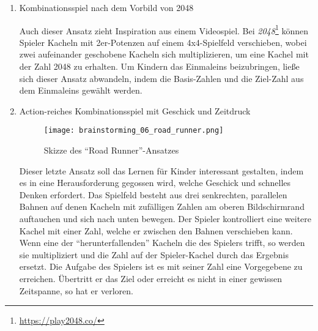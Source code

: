 \begin{enumerate}
  Dieser Ansatz ist inspiriert durch das Videospiel \emph{Dorfromantik}\footnote{\url{https://toukana.com/dorfromantik/}}, in dem verschiedene hexagonale Landschafts-Kacheln auf einem Spielbrett derart angebracht werden müssen, dass sie Synergie-Effekte erzielen.
  Wenn sich das Spielprinzip so anpassen ließe, dass eine Spielerin Kacheln mit verschiedenen Zahlen so platzieren muss, dass bei der Multiplikation von aneinanderliegenden Kacheln bestimmte Ergebnisse erzielt werden---ähnlich einem Sudoku---so könnte dies eine für Kinder anregende Lernmechanik darstellen.

  \item Kombinationsspiel nach dem Vorbild von 2048
  
  Auch dieser Ansatz zieht Inspiration aus einem Videospiel. Bei \emph{2048}\footnote{\url{https://play2048.co/}} können Spieler Kacheln mit 2er-Potenzen auf einem 4x4-Spielfeld verschieben, wobei zwei aufeinander geschobene Kacheln sich multiplizieren, um eine Kachel mit der Zahl 2048 zu erhalten.
  Um Kindern das Einmaleins beizubringen, ließe sich dieser Ansatz abwandeln, indem die Basis-Zahlen und die Ziel-Zahl aus dem Einmaleins gewählt werden.

  \item Action-reiches Kombinationsspiel mit Geschick und Zeitdruck
  
  \begin{figure}[h]
    \centering
    \texttt{[image: brainstorming\_06\_road\_runner.png]}
    \caption{Skizze des \enquote{Road Runner}-Ansatzes}
  \end{figure}

  Dieser letzte Ansatz soll das Lernen für Kinder interessant gestalten, indem es in eine Herausforderung gegossen wird, welche Geschick und schnelles Denken erfordert.
  Das Spielfeld besteht aus drei senkrechten, parallelen Bahnen auf denen Kacheln mit zufälligen Zahlen am oberen Bildschirmrand auftauchen und sich nach unten bewegen.
  Der Spieler kontrolliert eine weitere Kachel mit einer Zahl, welche er zwischen den Bahnen verschieben kann.
  Wenn eine der \enquote{herunterfallenden} Kacheln die des Spielers trifft, so werden sie multipliziert und die Zahl auf der Spieler-Kachel durch das Ergebnis ersetzt.
  Die Aufgabe des Spielers ist es mit seiner Zahl eine Vorgegebene zu erreichen.
  Übertritt er das Ziel oder erreicht es nicht in einer gewissen Zeitspanne, so hat er verloren. 

\end{enumerate}

